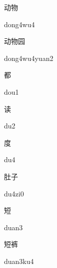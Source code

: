 \begin{multicols*}{2}
\begin{verbete}[dong4wu4]{动物}
\begin{pronuncia}{dong4wu4}
\end{pronuncia}
\end{verbete}

\begin{verbete}{动物园}
\begin{pronuncia}{dong4wu4yuan2}
\end{pronuncia}
\end{verbete}

\begin{verbete}[dou1]{都}
\begin{pronuncia}{dou1}
\end{pronuncia}
\end{verbete}

\begin{verbete}[du2]{读}
\begin{pronuncia}{du2}
\end{pronuncia}
\end{verbete}

\begin{verbete}[du4]{度}
\begin{pronuncia}{du4}
\end{pronuncia}
\end{verbete}

\begin{verbete}[du4zi0]{肚子}
\begin{pronuncia}{du4zi0}
\end{pronuncia}
\end{verbete}

\begin{verbete}[duan3]{短}
\begin{pronuncia}{duan3}
\end{pronuncia}
\end{verbete}

\begin{verbete}[duan3ku4]{短裤}
\begin{pronuncia}{duan3ku4}
\end{pronuncia}
\end{verbete}


\end{multicols*}
